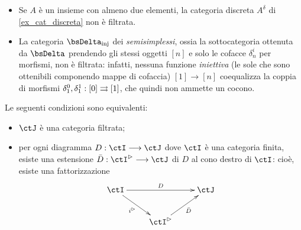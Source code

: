 \begin{examples}
\begin{itemize}
		\item Se \(A\) è un insieme con almeno due elementi, la categoria discreta \(A^\delta\) di \ref{ex_cat_discreta} non è filtrata.
		\item La categoria \(\bsDelta_\text{inj}\) dei \emph{semisimplessi}, ossia la sottocategoria ottenuta da \(\bsDelta\) prendendo gli stessi oggetti \([n]\) e solo le cofacce \(\delta_n^i\) per morfismi, non è filtrata: infatti, nessuna funzione \emph{iniettiva} (le sole che sono ottenibili componendo mappe di cofaccia) \([1] \to [n]\) coequalizza la coppia di morfismi \(\delta_1^0,\delta_1^1 : [0]\rightrightarrows [1]\), che quindi non ammette un cocono.
	\end{itemize}
\end{examples}
\begin{theorem}\label{estensione_filtrata}
	Le seguenti condizioni sono equivalenti:
	\begin{itemize}
		\item \(\ctJ\) è una categoria filtrata;
		\item per ogni diagramma \(D : \ctI \fun\ctJ\) dove \(\ctI\) è una categoria finita, esiste una estensione \(\bar D : \ctI^\rhd \fun \ctJ\) di \(D\) al cono destro di \(\ctI\): cioè, esiste una fattorizzazione
		      \[\xymatrix{
			      \ctI \ar[rr]^D \ar[dr]_-{i^\rhd} && \ctJ \\
			      & \ctI^\rhd\ar[ur]_-{\bar D}
			      }\]
	\end{itemize}
\end{theorem}
